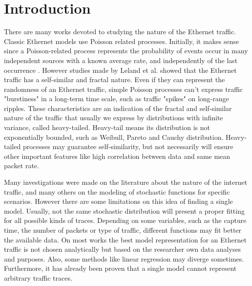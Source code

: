 \section{Introduction}\label{sec:introduction}

There are many works devoted to studying the nature of the Ethernet traffic\cite{selfsimilar-ethernet}. Classic Ethernet models use Poisson related processes. Initially, it makes sense since a Poisson-related process represents the probability of events occur in many independent sources with a known average rate, and independently of the last occurrence \cite{selfsimilar-ethernet} \cite{book-poisson}. However studies made by Leland et al.\cite{selfsimilar-ethernet} showed that the Ethernet traffic has a self-similar and fractal nature. Even if they can represent the randomness of an Ethernet traffic, simple Poisson processes can't express traffic "burstiness" in a long-term time scale, such as traffic "spikes" on long-range ripples. These characteristics are an indication of the fractal and self-similar nature of the traffic that usually we express by distributions with infinite variance, called heavy-tailed. Heavy-tail means its distribution is not exponentially bounded\cite{sourcesonoff-paper}, such as Weibull, Pareto and Cauchy distribution.  Heavy-tailed processes may guarantee self-similarity, but not necessarily will ensure other important features like high correlation between data and same mean packet rate.


Many investigations were made on the literature about the nature of the internet traffic\cite{selfsimilar-ethernet}\cite{analysis-self-similar}\cite{stochartic-selfsimilar}\cite{selfsimilar-highvariability}\cite{multi-player-online-game-self-similarity}, and many others on the modeling of stochastic functions for specific scenarios\cite{estimation-renewal-function-ethernet-traffic}\cite{modelling-of-self-similar}\cite{empirical-interarrival-study}\cite{modeling-concurrent-heavy-tailed}\cite{optimal-scheduling-of-heavy-tailed-traffic}\cite{modelling-of-self-similar}. However there are some limitations on this idea of finding a single model. Usually, not the same stochastic distribution will present a proper fitting for all possible kinds of traces\cite{sourcesonoff-paper}. Depending on some variables, such as the capture time, the number of packets or type of traffic, different functions may fit better the available data. On most works the best model representation for an Ethernet traffic is not chosen analytically but based on the researcher own data analyses and purposes\cite{hierarchical-dynamics-interarrival-times}\cite{modeling-concurrent-heavy-tailed}\cite{optimal-scheduling-of-heavy-tailed-traffic}. Also, some methods like linear regression may diverge sometimes. Furthermore, it has already been proven that a single model cannot represent arbitrary traffic traces\cite{sourcesonoff-paper}.  


